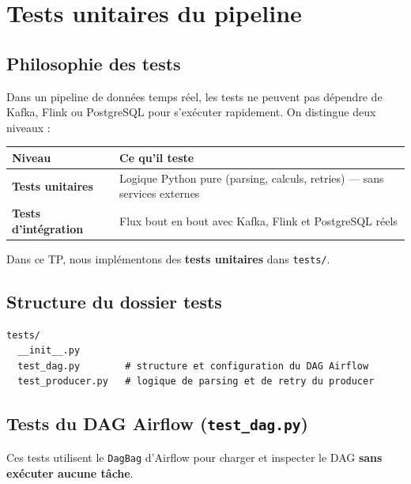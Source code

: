 \documentclass[12pt,a4paper]{article}
\begin{document}
\newpage

\section{Tests unitaires du pipeline}

\subsection{Philosophie des tests}

Dans un pipeline de données temps réel, les tests ne peuvent pas dépendre
de Kafka, Flink ou PostgreSQL pour s'exécuter rapidement.
On distingue deux niveaux :

\begin{center}
\begin{tabularx}{\textwidth}{lX}
  \toprule
  \textbf{Niveau} & \textbf{Ce qu'il teste} \\
  \midrule
  \textbf{Tests unitaires} & Logique Python pure (parsing, calculs, retries) --- sans services externes \\
  \textbf{Tests d'intégration} & Flux bout en bout avec Kafka, Flink et PostgreSQL réels \\
  \bottomrule
\end{tabularx}
\end{center}

Dans ce TP, nous implémentons des \textbf{tests unitaires} dans \texttt{tests/}.

\subsection{Structure du dossier tests}

\begin{lstlisting}[style=bash, caption={Arborescence des tests}]
tests/
  __init__.py
  test_dag.py        # structure et configuration du DAG Airflow
  test_producer.py   # logique de parsing et de retry du producer
\end{lstlisting}

\subsection{Tests du DAG Airflow (\texttt{test\_dag.py})}

Ces tests utilisent le \texttt{DagBag} d'Airflow pour charger et inspecter le DAG
\textbf{sans exécuter aucune tâche}.
\end{document}
